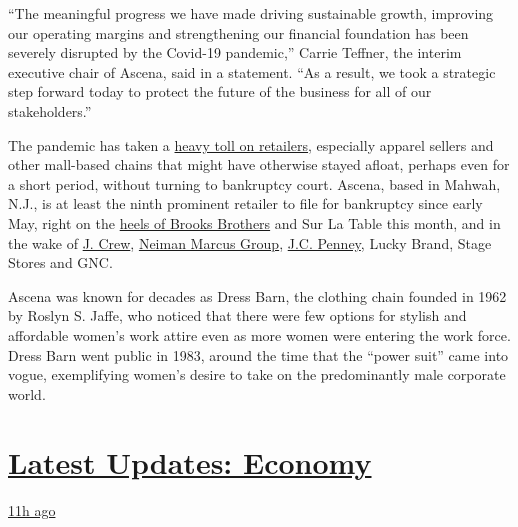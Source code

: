 ``The meaningful progress we have made driving sustainable growth,
improving our operating margins and strengthening our financial
foundation has been severely disrupted by the Covid-19 pandemic,''
Carrie Teffner, the interim executive chair of Ascena, said in a
statement. ``As a result, we took a strategic step forward today to
protect the future of the business for all of our stakeholders.''

The pandemic has taken a
\href{https://www.nytimes3xbfgragh.onion/2020/07/05/business/coronavirus-malls-department-stores-bankruptcy.html}{heavy
toll on retailers}, especially apparel sellers and other mall-based
chains that might have otherwise stayed afloat, perhaps even for a short
period, without turning to bankruptcy court. Ascena, based in Mahwah,
N.J., is at least the ninth prominent retailer to file for bankruptcy
since early May, right on the
\href{https://www.nytimes3xbfgragh.onion/2020/07/08/business/brooks-brothers-chapter-11-bankruptcy.html}{heels
of Brooks Brothers} and Sur La Table this month, and in the wake of
\href{https://www.nytimes3xbfgragh.onion/2020/05/03/business/j-crew-bankruptcy-coronavirus.html}{J.
Crew},
\href{https://www.nytimes3xbfgragh.onion/2020/05/07/business/neiman-marcus-bankruptcy.html}{Neiman
Marcus Group},
\href{https://www.nytimes3xbfgragh.onion/2020/05/15/business/jc-penney-bankruptcy-coronavirus.html}{J.C.
Penney}, Lucky Brand, Stage Stores and GNC.

Ascena was known for decades as Dress Barn, the clothing chain founded
in 1962 by Roslyn S. Jaffe, who noticed that there were few options for
stylish and affordable women's work attire even as more women were
entering the work force. Dress Barn went public in 1983, around the time
that the ``power suit'' came into vogue, exemplifying women's desire to
take on the predominantly male corporate world.

\hypertarget{latest-updates-economy}{%
\section{\texorpdfstring{\href{https://www.nytimes3xbfgragh.onion/live/2020/08/03/business/stock-market-today-coronavirus?action=click\&pgtype=Article\&state=default\&region=MAIN_CONTENT_1\&context=storylines_live_updates}{Latest
Updates:
Economy}}{Latest Updates: Economy}}\label{latest-updates-economy}}

\href{https://www.nytimes3xbfgragh.onion/live/2020/08/03/business/stock-market-today-coronavirus?action=click\&pgtype=Article\&state=default\&region=MAIN_CONTENT_1\&context=storylines_live_updates\#the-chicago-fed-president-says-its-up-to-congress-to-save-the-economy}{11h
ago}

